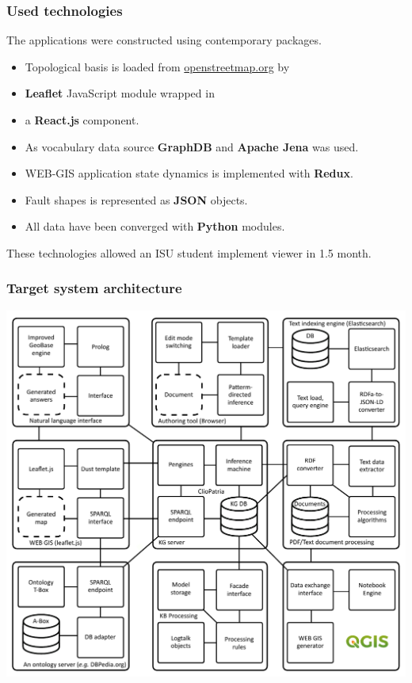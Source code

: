 \documentclass[10pt]{beamer}
\begin{document}
\begin{frame}
  \frametitle{Used technologies}
  The applications were constructed using contemporary packages.
  \begin{itemize}
  \item Topological basis is loaded from \url{openstreetmap.org} by
  \item \textbf{Leaflet} JavaScript module wrapped in
  \item a \textbf{React.js} component.
  \item As vocabulary data source \textbf{GraphDB} and\textbf{ Apache Jena} was used.
  \item WEB-GIS application state dynamics is implemented with \textbf{Redux}.
  \item Fault shapes is represented as \textbf{JSON} objects.
  \item All data have been converged with \textbf{Python} modules.
  \end{itemize}

  These technologies allowed an ISU student implement viewer in 1.5 month.
\end{frame}


\begin{frame}
  \frametitle{Target system architecture}
  \centering
  \includegraphics[width=0.8\linewidth]{architecture.pdf}
\end{frame}
\end{document}
